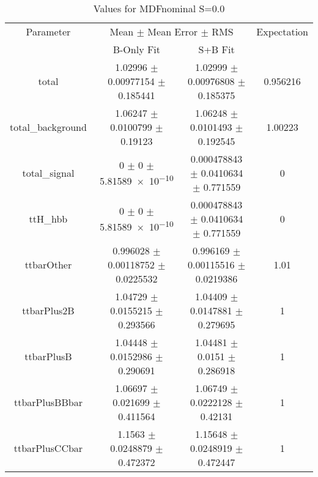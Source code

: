 \begin{table}
\centering
\caption{Values for MDFnominal S=0.0}
\begin{tabular}{cccc}
\toprule
Parameter & \multicolumn{2}{c}{Mean $\pm$ Mean Error $\pm$ RMS} & Expectation\\
 & B-Only Fit & S+B Fit & \\
\midrule
total & \num{1.02996} $\pm$ \num{0.00977154} $\pm$ \num{0.185441} & \num{1.02999} $\pm$ \num{0.00976808} $\pm$ \num{0.185375} & \num{0.956216}\\
total\_background & \num{1.06247} $\pm$ \num{0.0100799} $\pm$ \num{0.19123} & \num{1.06248} $\pm$ \num{0.0101493} $\pm$ \num{0.192545} & \num{1.00223}\\
total\_signal & \num{0} $\pm$ \num{0} $\pm$ \num{5.81589e-10} & \num{0.000478843} $\pm$ \num{0.0410634} $\pm$ \num{0.771559} & \num{0}\\
ttH\_hbb & \num{0} $\pm$ \num{0} $\pm$ \num{5.81589e-10} & \num{0.000478843} $\pm$ \num{0.0410634} $\pm$ \num{0.771559} & \num{0}\\
ttbarOther & \num{0.996028} $\pm$ \num{0.00118752} $\pm$ \num{0.0225532} & \num{0.996169} $\pm$ \num{0.00115516} $\pm$ \num{0.0219386} & \num{1.01}\\
ttbarPlus2B & \num{1.04729} $\pm$ \num{0.0155215} $\pm$ \num{0.293566} & \num{1.04409} $\pm$ \num{0.0147881} $\pm$ \num{0.279695} & \num{1}\\
ttbarPlusB & \num{1.04448} $\pm$ \num{0.0152986} $\pm$ \num{0.290691} & \num{1.04481} $\pm$ \num{0.0151} $\pm$ \num{0.286918} & \num{1}\\
ttbarPlusBBbar & \num{1.06697} $\pm$ \num{0.021699} $\pm$ \num{0.411564} & \num{1.06749} $\pm$ \num{0.0222128} $\pm$ \num{0.42131} & \num{1}\\
ttbarPlusCCbar & \num{1.1563} $\pm$ \num{0.0248879} $\pm$ \num{0.472372} & \num{1.15648} $\pm$ \num{0.0248919} $\pm$ \num{0.472447} & \num{1}\\
\bottomrule
\end{tabular}
\end{table}